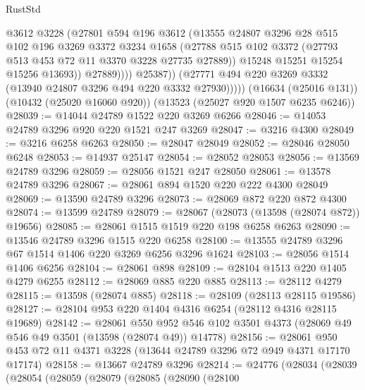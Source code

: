 \begin{lexlean}{RustStd}
\begin{coremodule}
                      @3612
                      @3228
                      (@27801
                        @594
                        @196
                        @3612
                        (@13555
                          @24807
                          @3296
                          @28
                          @515
                          @102
                          @196
                          @3269
                          @3372
                          @3234
                          @1658
                          (@27788
                            @515
                            @102
                            @3372
                            (@27793 @513 @453 @72 @11 @3370 @3228 @27735 @27889))
                          @15248
                          @15251
                          @15254
                          @15256
                          @13693))
                      @27889))))
              @25387))
          (@27771 @494 @220 @3269 @3332 (@13940 @24807 @3296 @494 @220 @3332 @27930)))))
    (@16634 (@25016 @131))
    (@10432 (@25020 @16060 @920))
    (@13523 (@25027 @920 @1507 @6235 @6246))
@28039 := @14044 @24789 @1522 @220 @3269 @6266
@28046 := @14053 @24789 @3296 @920 @220 @1521 @247 @3269
@28047 := @3216 @4300
@28049 := @3216 @6258 @6263
@28050 := @28047 @28049
@28052 := @28046 @28050 @6248
@28053 := @14937 @25147
@28054 := @28052 @28053
@28056 := @13569 @24789 @3296
@28059 := @28056 @1521 @247 @28050
@28061 := @13578 @24789 @3296
@28067 := @28061 @894 @1520 @220 @222 @4300 @28049
@28069 := @13590 @24789 @3296
@28073 := @28069 @872 @220 @872 @4300
@28074 := @13599 @24789
@28079 := @28067 (@28073 (@13598 (@28074 @872)) @19656)
@28085 := @28061 @1515 @1519 @220 @198 @6258 @6263
@28090 := @13546 @24789 @3296 @1515 @220 @6258
@28100 := @13555 @24789 @3296 @67 @1514 @1406 @220 @3269 @6256 @3296 @1624
@28103 := @28056 @1514 @1406 @6256
@28104 := @28061 @898
@28109 := @28104 @1513 @220 @1405 @4279 @6255
@28112 := @28069 @885 @220 @885
@28113 := @28112 @4279
@28115 := @13598 (@28074 @885)
@28118 := @28109 (@28113 @28115 @19586)
@28127 := @28104 @953 @220 @1404 @4316 @6254 (@28112 @4316 @28115 @19689)
@28142 := @28061
    @550
    @952
    @546
    @102
    @3501
    @4373
    (@28069 @49 @546 @49 @3501 (@13598 (@28074 @49)) @14778)
@28156 := @28061 @950 @453 @72 @11 @4371 @3228 (@13644 @24789 @3296 @72 @949 @4371 @17170 @17174)
@28158 := @13667 @24789 @3296
@28214 := @24776
    (@28034
      (@28039
        (@28054
          (@28059
            (@28079
              (@28085
                (@28090
                  (@28100

\end{coremodule}
\end{lexlean}
